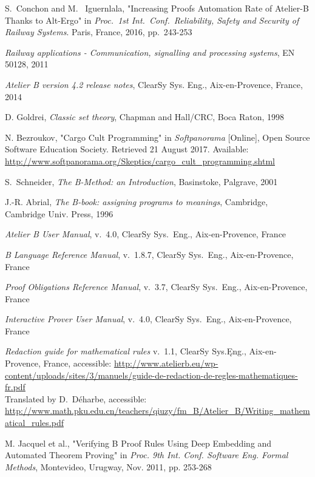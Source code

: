 \documentclass[11pt,journal]{IEEEtran}
\begin{document}
	\begin{thebibliography}{2}
		S.~Conchon and M.~ Iguernlala, "Increasing Proofs Automation Rate of Atelier-B Thanks to Alt-Ergo" in \emph{Proc.~1st Int.~Conf.~Reliability, Safety and Security of Railway Systems}. Paris, France, 2016, pp.~243-253
		
		\emph{Railway applications - Communication, signalling and processing systems}, EN 50128, 2011
		
		\emph{Atelier B version 4.2 release notes}, ClearSy Sys. Eng., Aix-en-Provence, France, 2014
		
		D. Goldrei, \emph{Classic set theory}, Chapman and Hall/CRC, Boca Raton, 1998
		
		N. Bezroukov, "Cargo Cult Programming" in \emph{Softpanorama} [Online],  Open Source Software Education Society. Retrieved 21 August 2017. Available: \url{http://www.softpanorama.org/Skeptics/cargo_cult_programming.shtml}
		
		S.~Schneider, \emph{The B-Method: an Introduction}, Basinstoke, Palgrave, 2001
		
		J.-R. Abrial, \emph{The B-book: assigning programs to meanings}, Cambridge, Cambridge Univ. Press, 1996
		
		\emph{Atelier B User Manual}, v.~4.0, ClearSy Sys.~Eng., Aix-en-Provence, France
		
		\emph{B Language Reference Manual}, v.~1.8.7, ClearSy Sys.~Eng., Aix-en-Provence, France
		
		\emph{Proof Obligations Reference Manual}, v.~3.7, ClearSy Sys.~Eng., Aix-en-Provence, France
		
		\emph{Interactive Prover User Manual}, v.~4.0, ClearSy Sys.~Eng., Aix-en-Provence, France
		
		\emph{Redaction guide for mathematical rules} v.~1.1, ClearSy Sys.Ęng., Aix-en-Provence, France, accessible: \url{http://www.atelierb.eu/wp-content/uploads/sites/3/manuels/guide-de-redaction-de-regles-mathematiques-fr.pdf}\\
		Translated by D.~D\'{e}harbe, accessible: 
		\url{http://www.math.pku.edu.cn/teachers/qiuzy/fm_B/Atelier_B/Writing_mathematical_rules.pdf}
		
		M. Jacquel et al., "Verifying B Proof Rules Using Deep Embedding and Automated Theorem Proving" in \emph{Proc. 9th Int. Conf. Software Eng. Formal Methods}, Montevideo, Urugway, Nov. 2011, pp. 253-268
		

\end{thebibliography}
\end{document}
